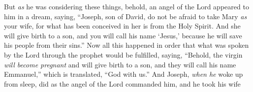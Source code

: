 \begin{biblechapter}
\verse But \textit{as} he was considering these things, behold, an angel of the Lord appeared to him in a dream, saying, “Joseph, son of David, do not be afraid to take Mary \textit{as} your wife, for what has been conceived in her is from the Holy Spirit.
\verse And she will give birth to a son, and you will call his name ‘Jesus,’ because he will save his people from their sins.”
\verse Now all this happened in order that what was spoken by the Lord through the prophet would be fulfilled, saying,
\verse “Behold, the virgin \textit{will become pregnant} and will give birth to a son, 
and they will call his name Emmanuel,”
\verse which is translated, “God with us.”
\verse And Joseph, \textit{when he} woke up from sleep, did as the angel of the Lord commanded him, and he took his wife
\end{biblechapter}

